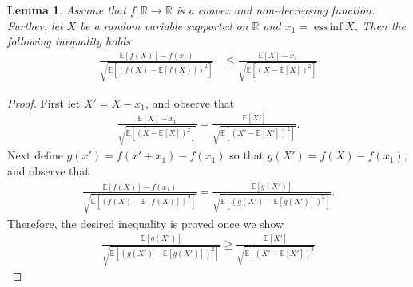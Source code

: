 \documentclass[letter, 12pt]{report}
\newcommand{\R}{\mathbb R}
\newcommand{\essinf}{\operatorname{ess\,inf}}
\newcommand{\E}{\mathbb E}
\newcommand{\1}{\mathbf{1}}
\theoremstyle{plain}
\newtheorem{lemma}[theorem]{Lemma}
\theoremstyle{definition}
\theoremstyle{remark}
\begin{document}
\begin{lemma}
    \label{lem:key-convex-ineq}
    Assume that $f: \R \to \R$ is a convex and non-decreasing function.
    Further, let $X$ be a random variable supported on $\R$
    and $x_1 = \essinf X$.
    Then the following inequality holds
    \begin{align*}
        \frac{
            \E[f(X)] - f(x_1)
        }{
            \sqrt{
                \E\left[
                    \left(f(X) - \E[f(X)]\right)^2
                    \right]
            }
        }
         & \leq
        \frac{
            \E[X] - x_1
        }{
            \sqrt{
                \E\left[
                    \left(X - \E[X]\right)^2
                    \right]
            }
        }
    \end{align*}
\end{lemma}
\begin{proof}
    First let $X' = X - x_1$,
    and observe that
    \begin{align*}
        \frac{
            \E[X] - x_1
        }{
            \sqrt{
                \E\left[
                    \left(X - \E[X]\right)^2
                    \right]
            }
        }
        =
        \frac{
            \E[X']
        }{
            \sqrt{
                \E\left[
                    \left(X' - \E[X']\right)^2
                    \right]
            }
        }.
    \end{align*}
    Next define $g(x')=f(x' + x_1) - f(x_1)$ so that
    $g(X') = f(X) - f(x_1)$, and observe that
    \begin{align*}
        \frac{
            \E[f(X)] - f(x_1)
        }{
            \sqrt{
                \E\left[
                    \left(f(X) - \E[f(X)]\right)^2
                    \right]
            }
        }
        =
        \frac{
            \E[g(X')]
        }{
            \sqrt{
                \E\left[
                    \left(g(X')
                    - \E[g(X')]\right)^2
                    \right]
            }
        }.
    \end{align*}
    Therefore, the desired inequality is
    proved once we show
    \begin{align*}
        \frac{
            \E[g(X')]
        }{
            \sqrt{
                \E\left[
                    \left(g(X')
                    - \E[g(X')]\right)^2
                    \right]
            }
        }
        \geq
        \frac{
            \E[X']
        }{
            \sqrt{
                \E\left[
                    \left(X' - \E[X']\right)^2
}}
\end{align*}
\end{proof}
\end{document}
